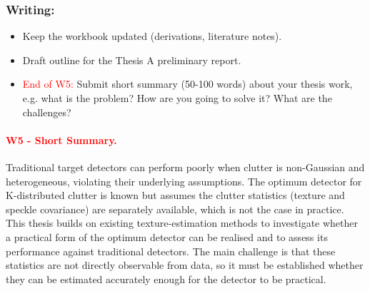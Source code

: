 \documentclass{article}
\begin{document}
\subsubsection{Writing:}
\begin{itemize}
    \item Keep the workbook updated (derivations, literature notes).
    \item Draft outline for the Thesis A preliminary report.
    \item \textcolor{red}{End of W5:} Submit short summary (50-100 words) about your thesis work, e.g. what is the problem? How are you going to solve it? What are the challenges? 
\end{itemize}

\paragraph{\textcolor{red}{W5 - Short Summary.}}
Traditional target detectors can perform poorly when clutter is non-Gaussian and heterogeneous, violating their underlying assumptions. The optimum detector for K-distributed clutter is known but assumes the clutter statistics (texture and speckle covariance) are separately available, which is not the case in practice. This thesis builds on existing texture-estimation methods to investigate whether a practical form of the optimum detector can be realised and to assess its performance against traditional detectors. The main challenge is that these statistics are not directly observable from data, so it must be established whether they can be estimated accurately enough for the detector to be practical.


\newpage

\end{document}
